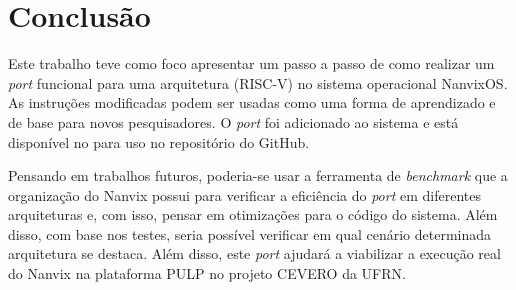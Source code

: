 \section{Conclusão}

Este trabalho teve como foco apresentar um passo a passo de como realizar um \textit{port} funcional para uma arquitetura (RISC-V) no sistema operacional NanvixOS. 
As instruções modificadas podem ser usadas como uma forma de aprendizado e de base para novos pesquisadores. O \textit{port} foi adicionado ao sistema e está disponível no para uso no repositório do GitHub.

Pensando em trabalhos futuros, poderia-se usar a ferramenta de \textit{benchmark} que a organização do Nanvix possui para verificar a eficiência do \textit{port} em diferentes arquiteturas e, com isso, pensar em otimizações para o código do sistema. Além disso, com base nos testes, seria possível verificar em qual cenário determinada arquitetura se destaca. Além disso, este \textit{port} ajudará a viabilizar a execução real do Nanvix na plataforma PULP no projeto CEVERO da UFRN.
